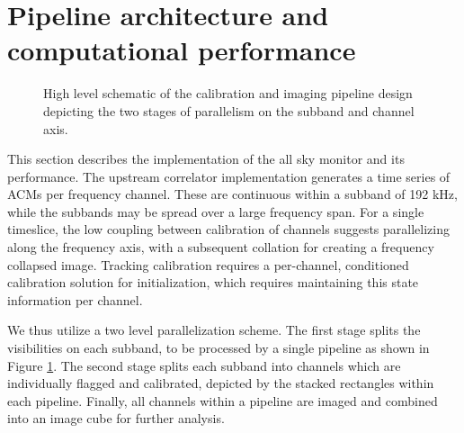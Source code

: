 \documentclass{aa}
\begin{document}
\section{\label{sec:Computational-performance}Pipeline architecture and computational performance}
\begin{figure}[tbh]
\caption{\label{fig:pipeline}  High  level  schematic  of  the  calibration  and
  imaging pipeline design depicting the two stages of parallelism on the subband
  and channel axis.}
\end{figure}

This  section  describes the  implementation  of the  all  sky  monitor and  its
performance. The  upstream correlator implementation generates a  time series of
ACMs per  frequency channel. These are  continuous within a subband  of 192 kHz,
while  the subbands may  be spread  over a  large frequency  span. For  a single
timeslice,   the  low   coupling  between   calibration  of   channels  suggests
parallelizing along the frequency axis, with a subsequent collation for creating
a  frequency  collapsed image.   Tracking  calibration  requires a  per-channel,
conditioned calibration solution  for initialization, which requires maintaining
this state information per channel. 

We thus utilize  a two level parallelization scheme. The  first stage splits the
visibilities on each  subband, to be processed by a single  pipeline as shown in
Figure \ref{fig:pipeline}.   The second stage splits each  subband into channels
which  are  individually  flagged   and  calibrated,  depicted  by  the  stacked
rectangles within  each pipeline.  Finally,  all channels within a  pipeline are
imaged and combined into an image cube for further analysis.
\end{document}

